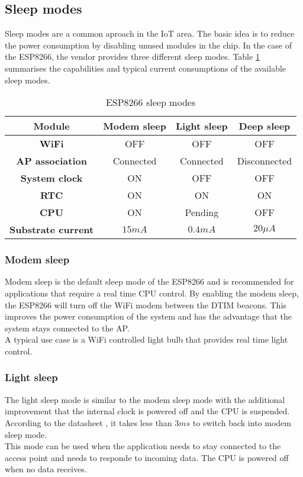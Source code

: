 \subsection{Sleep modes}
Sleep modes are a common aproach in the IoT area. 
The basic idea is to reduce the power consumption by disabling unused modules in the chip.
In the case of the ESP8266, the vendor provides three different sleep modes. 
Table \ref{tab_sleep_modes} summarises the capabilities and typical current consumptions of the available sleep modes.
\cite{mesquita_assessing_2018}

\begin{table}[htbp]
\caption{ESP8266 sleep modes}
\begin{center}
\begin{tabular}{|c|c|c|c|}
\hline
\textbf{Module}&\textbf{Modem sleep}&\textbf{Light sleep}&\textbf{Deep sleep}\\
\hline
\textbf{WiFi} & OFF & OFF & OFF\\
\textbf{AP association} & Connected & Connected & Disconnected\\
\textbf{System clock} & ON & OFF & OFF\\
\textbf{RTC} & ON & ON & ON\\
\textbf{CPU} & ON & Pending & OFF\\
\hline
\textbf{Substrate current} & $15mA$ & $0.4mA$ & $20\mu A$\\
\hline
\end{tabular}
\label{tab_sleep_modes}
\end{center}
\end{table}

\subsubsection{Modem sleep}
Modem sleep is the default sleep mode of the ESP8266 and is recommended for applications that require a real time CPU control. \cite{mesquita_assessing_2018}
By enabling the modem sleep, the ESP8266 will turn off the WiFi modem between the DTIM beacons. 
This improves the power consumption of the system and has the advantage that the system stays connected to the AP. \cite{espressif_inc_esp8266_2016}\\
A typical use case is a WiFi controlled light bulb that provides real time light control.

\subsubsection{Light sleep}
The light sleep mode is similar to the modem sleep mode with the additional improvement that the internal clock is powered off and the CPU is suspended.\\
According to the datasheet \cite{espressif_inc_esp8266_2016}, it takes less than $3ms$ to switch back into modem sleep mode.\\
This mode can be used when the application needs to stay connected to the access point 
and needs to responde to incoming data. The CPU is powered off when no data receives.

